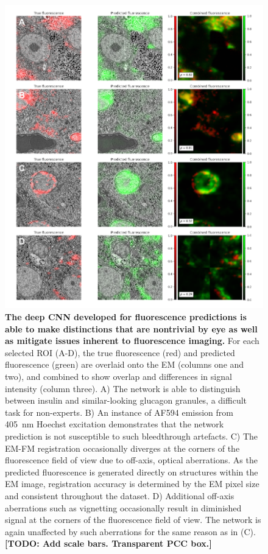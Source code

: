 \begin{figure}[!tbh]
    \centering
    \includegraphics[width=\linewidth]{chapter-4/figures/figS1_rois_v2.pdf}
    \caption{\textbf{The deep CNN developed for fluorescence predictions is able to make distinctions that are nontrivial by eye as well as mitigate issues inherent to fluorescence imaging.}
    For each selected ROI (A-D), the true fluorescence (red) and predicted fluorescence (green) are overlaid onto the EM (columns one and two), and combined to show overlap and differences in signal intensity (column three).
    A) The network is able to distinguish between insulin and similar-looking glucagon granules, a difficult task for non-experts.
    B) An instance of AF594 emission from \SI{405}{\nano\meter} Hoechst excitation demonstrates that the network prediction is not susceptible to such bleedthrough artefacts.
    C) The EM-FM registration occasionally diverges at the corners of the fluorescence field of view due to off-axis, optical aberrations. As the predicted fluorescence is generated directly on structures within the EM image, registration accuracy is determined by the EM pixel size and consistent throughout the dataset. 
    D) Additional off-axis aberrations such as vignetting occasionally result in diminished signal at the corners of the fluorescence field of view. The network is again unaffected by such aberrations for the same reason as in (C).
    \textbf{[TODO: Add scale bars. Transparent PCC box.]}}
    \label{fig:4.S1_rois}
\end{figure}
